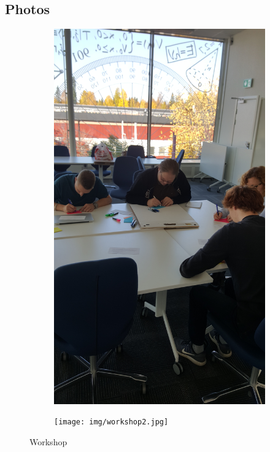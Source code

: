 \newpage
\subsection*{Photos}
\begin{figure}[ht]
\centering
    \begin{subfigure}{.45\textwidth}
        \centering
        \includegraphics[width=\textwidth, angle=270, origin=c]{img/workshop1.jpg}
        \label{fig:workshop1}
    \end{subfigure}
    \begin{subfigure}{.45\textwidth}
        \centering
        \texttt{[image: img/workshop2.jpg]}
        \label{fig:workshop2}
    \end{subfigure}

    \caption{Workshop}
\end{figure}

